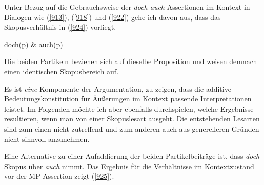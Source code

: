 {Unter Bezug auf die Gebrauchsweise der \textit{doch auch}-Assertionen im Kontext in Dialogen wie (\ref{913}), (\ref{918}) und (\ref{922}) gehe ich davon aus, dass das Skopusverhältnis in (\ref{924}) vorliegt.

\begin{exe}
	\ex\label{924} 
	doch(p) \& auch(p)
\end{exe}	
Die beiden Partikeln beziehen sich auf dieselbe Proposition und weisen demnach einen identischen Skopusbereich auf. 

Es ist \emph{eine} Komponente der Argumentation, zu zeigen, dass die additive Bedeutungskonstitution für Äußerungen im Kontext passende Interpretationen leistet. Im Folgenden möchte ich aber ebenfalls durchspielen, welche Ergebnisse resultieren, wenn man von einer Skopuslesart ausgeht. Die entstehenden Lesarten sind zum einen nicht zutreffend und zum anderen auch aus generelleren Gründen nicht sinnvoll anzunehmen.

Eine Alternative zu einer Aufaddierung der beiden Partikelbeiträge ist, dass \textit{doch} Skopus über \textit{auch} nimmt. Das Ergebnis für die Verhältnisse im Kontextzustand vor der MP-Assertion zeigt (\ref{925}).

}
